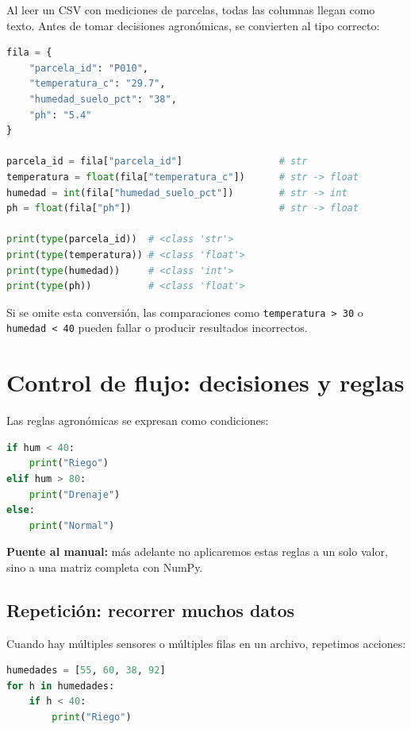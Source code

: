 \documentclass[11pt, a4paper]{article}
\begin{document}
Al leer un CSV con mediciones de parcelas, todas las columnas llegan como texto. Antes de tomar decisiones agronómicas, se convierten al tipo correcto:

\begin{lstlisting}[language=Python, caption={Asegurar tipos correctos desde CSV}]
fila = {
    "parcela_id": "P010",
    "temperatura_c": "29.7",
    "humedad_suelo_pct": "38",
    "ph": "5.4"
}

parcela_id = fila["parcela_id"]                 # str
temperatura = float(fila["temperatura_c"])      # str -> float
humedad = int(fila["humedad_suelo_pct"])        # str -> int
ph = float(fila["ph"])                          # str -> float

print(type(parcela_id))  # <class 'str'>
print(type(temperatura)) # <class 'float'>
print(type(humedad))     # <class 'int'>
print(type(ph))          # <class 'float'>
\end{lstlisting}

Si se omite esta conversión, las comparaciones como \texttt{temperatura > 30} o \texttt{humedad < 40} pueden fallar o producir resultados incorrectos.
\newpage
\section{Control de flujo: decisiones y reglas}
Las reglas agronómicas se expresan como condiciones:

\begin{lstlisting}[language=Python, caption={Decisión simple con if/elif/else}]
if hum < 40:
    print("Riego")
elif hum > 80:
    print("Drenaje")
else:
    print("Normal")
\end{lstlisting}

\textbf{Puente al manual:} más adelante no aplicaremos estas reglas a un solo valor, sino a una matriz completa con NumPy.

\subsection{Repetición: recorrer muchos datos}
Cuando hay múltiples sensores o múltiples filas en un archivo, repetimos acciones:

\begin{lstlisting}[language=Python, caption={Recorrer una lista con for}]
humedades = [55, 60, 38, 92]
for h in humedades:
    if h < 40:
        print("Riego")
\end{lstlisting}
\end{document}
